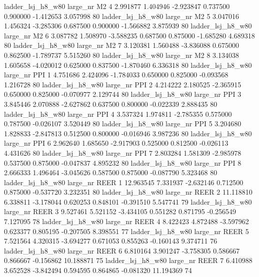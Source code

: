   ladder_lsj_h8_w80   large_nr       M2                 4  2.991877  1.404946  -2.923847 0.737500 0.900000 -1.412653    3.057998 80
  ladder_lsj_h8_w80   large_nr       M2                 5  3.047016  1.456324  -3.285306 0.687500 0.900000 -1.566882    3.875939 80
  ladder_lsj_h8_w80   large_nr       M2                 6  3.087782  1.508970  -3.588235 0.687500 0.875000 -1.685280    4.689318 80
  ladder_lsj_h8_w80   large_nr       M2                 7  3.120381  1.560488  -3.836088 0.675000 0.862500 -1.789737    5.515260 80
  ladder_lsj_h8_w80   large_nr       M2                 8  3.134038  1.605658  -4.020012 0.625000 0.837500 -1.870460    6.336318 80
  ladder_lsj_h8_w80   large_nr      PPI                 1  4.751686  2.424096  -1.784033 0.650000 0.825000 -0.093568    1.216728 80
  ladder_lsj_h8_w80   large_nr      PPI                 2  4.214222  2.180525  -2.365915 0.650000 0.825000 -0.070977    2.129744 80
  ladder_lsj_h8_w80   large_nr      PPI                 3  3.845446  2.070888  -2.627862 0.637500 0.800000 -0.022339    2.888435 80
  ladder_lsj_h8_w80   large_nr      PPI                 4  3.537324  1.974811  -2.785355 0.575000 0.787500 -0.026107    3.520449 80
  ladder_lsj_h8_w80   large_nr      PPI                 5  3.204680  1.828833  -2.847813 0.512500 0.800000 -0.016946    3.987236 80
  ladder_lsj_h8_w80   large_nr      PPI                 6  2.962640  1.685650  -2.917903 0.525000 0.812500 -0.026113    4.431626 80
  ladder_lsj_h8_w80   large_nr      PPI                 7  2.803284  1.581309  -2.985978 0.537500 0.875000 -0.047837    4.895232 80
  ladder_lsj_h8_w80   large_nr      PPI                 8  2.666333  1.496464  -3.045626 0.587500 0.875000 -0.087790    5.323468 80
  ladder_lsj_h8_w80   large_nr     REER                 1 12.963545  7.331937  -2.632146 0.712500 0.875000 -0.537720    3.232351 80
  ladder_lsj_h8_w80   large_nr     REER                 2 11.118810  6.338811  -3.178044 0.620253 0.848101 -0.391510    5.547741 79
  ladder_lsj_h8_w80   large_nr     REER                 3  9.527461  5.521152  -3.434105 0.551282 0.871795 -0.256549    7.127095 78
  ladder_lsj_h8_w80   large_nr     REER                 4  8.422423  4.872488  -3.597962 0.623377 0.805195 -0.207505    8.398551 77
  ladder_lsj_h8_w80   large_nr     REER                 5  7.521564  4.320315  -3.694277 0.671053 0.855263 -0.160143    9.374711 76
  ladder_lsj_h8_w80   large_nr     REER                 6  6.810164  3.901247  -3.758305 0.586667 0.866667 -0.156862   10.188871 75
  ladder_lsj_h8_w80   large_nr     REER                 7  6.410988  3.652528  -3.842494 0.594595 0.864865 -0.081320   11.194369 74
